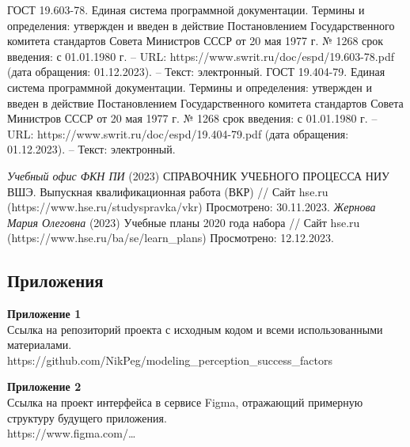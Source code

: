 \documentclass{article}
\newcommand\zz[1]{\par{\normalsize\strut #1} \hfill\ignorespaces}
\begin{document}
\begin{thebibliography}{}
         ГОСТ 19.603-78. Единая система программной документации. Термины и определения: утвержден и введен в действие Постановлением Государственного комитета стандартов Совета Министров СССР от 20 мая 1977 г. № 1268 срок введения: с 01.01.1980 г. – URL: https://www.swrit.ru/doc/espd/19.603-78.pdf (дата обращения: 01.12.2023). – Текст: электронный.
         ГОСТ 19.404-79. Единая система программной документации. Термины и определения: утвержден и введен в действие Постановлением Государственного комитета стандартов Совета Министров СССР от 20 мая 1977 г. № 1268 срок введения: с 01.01.1980 г. – URL: https://www.swrit.ru/doc/espd/19.404-79.pdf (дата обращения: 01.12.2023). – Текст: электронный.

         \textit{Учебный офис ФКН ПИ} (2023) СПРАВОЧНИК УЧЕБНОГО ПРОЦЕССА НИУ ВШЭ. Выпускная квалификационная работа (ВКР) // Сайт hse.ru (https://www.hse.ru/studyspravka/vkr) Просмотрено: 30.11.2023.
         \textit{Жернова Мария Олеговна} (2023) Учебные планы 2020 года набора // Сайт hse.ru (https://www.hse.ru/ba/se/learn\_plans) Просмотрено: 12.12.2023.
    \end{thebibliography}
    \newpage
    \begin{center}
        \section*{Приложения}
    \end{center}
    \zz{}\textbf{Приложение 1\\}
    Ссылка на репозиторий проекта с исходным кодом и всеми использованными материалами.\\
    https://github.com/NikPeg/modeling\_perception\_success\_factors\\
    \zz{}\textbf{Приложение 2\\}
    Ссылка на проект интерфейса в сервисе Figma, отражающий примерную структуру будущего приложения.\\
    https://www.figma.com/\ldots\\
\end{document}
